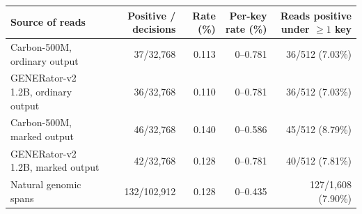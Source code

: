 \begin{tabular}{@{}l r r r r@{}}
\toprule
Source of reads & Positive / decisions & Rate (\%) & Per-key rate (\%) & Reads positive under $\geq 1$ key \\
\midrule
Carbon-500M, ordinary output & 37/32{,}768 & 0.113 & 0--0.781 & 36/512 (7.03\%) \\
GENERator-v2 1.2B, ordinary output & 36/32{,}768 & 0.110 & 0--0.781 & 36/512 (7.03\%) \\
Carbon-500M, marked output & 46/32{,}768 & 0.140 & 0--0.586 & 45/512 (8.79\%) \\
GENERator-v2 1.2B, marked output & 42/32{,}768 & 0.128 & 0--0.781 & 40/512 (7.81\%) \\
Natural genomic spans & 132/102{,}912 & 0.128 & 0--0.435 & 127/1{,}608 (7.90\%) \\
\bottomrule
\end{tabular}
